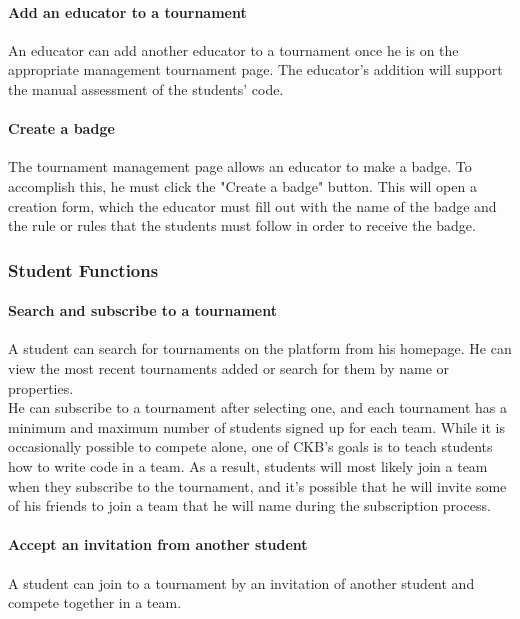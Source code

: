 \paragraph{Add an educator to a tournament}
An educator can add another educator to a tournament once he is on the appropriate management tournament page. The educator's addition will support the manual assessment of the students' code.

\paragraph{Create a badge}
The tournament management page allows an educator to make a badge. To accomplish this, he must click the "Create a badge" button. This will open a creation form, which the educator must fill out with the name of the badge and the rule 
or rules that the students must follow in order to receive the badge.

\subsubsection{Student Functions}

\paragraph{Search and subscribe to a tournament}
A student can search for tournaments on the platform from his homepage. He can view the most recent tournaments added or search for them by name or properties.\\
He can subscribe to a tournament after selecting one, and each tournament has a minimum and maximum number of students signed up for each team. While it is occasionally possible to compete alone, one of CKB's goals is to teach 
students how to write code in a team. As a result, students will most likely join a team when they subscribe to the tournament, and it's possible that he will invite some of his friends to join a team that he will name during the 
subscription process.

\paragraph{Accept an invitation from another student}
A student can join to a tournament by an invitation of another student and compete together in a team.


